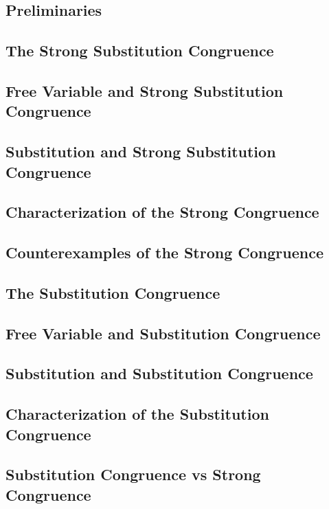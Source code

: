 \documentclass{report}
\begin{document}
    \subsection{Preliminaries}
      
    \subsection{The Strong Substitution Congruence}
      
    \subsection{Free Variable and Strong Substitution Congruence}
      
    \subsection{Substitution and Strong Substitution Congruence}
      
    \subsection{Characterization of the Strong Congruence}
      
    \subsection{Counterexamples of the Strong Congruence}
      
    \subsection{The Substitution Congruence}
      
    \subsection{Free Variable and Substitution Congruence}
      
    \subsection{Substitution and Substitution Congruence}
      
    \subsection{Characterization of the Substitution Congruence}
      
    \subsection{Substitution Congruence vs Strong Congruence}
      
\end{document}
